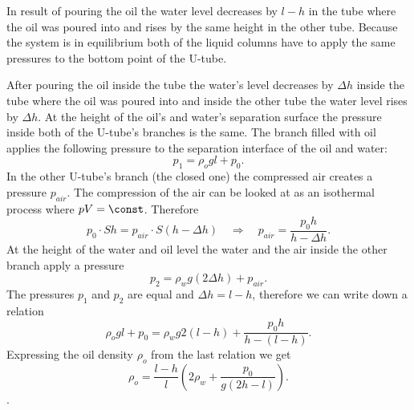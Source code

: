 \hinteng
In result of pouring the oil the water level decreases by $l - h$ in the tube where the oil was poured into and rises by the same height in the other tube. Because the system is in equilibrium both of the liquid columns have to apply the same pressures to the bottom point of the U-tube.

\solueng
After pouring the oil inside the tube the water’s level decreases by $\Delta h$ inside the tube where the oil was poured into and inside the other tube the water level rises by $\Delta h$. At the height of the oil’s and water’s separation surface the pressure inside both of the U-tube’s branches is the same. The branch filled with oil applies the following pressure to the separation interface of the oil and water:
\[ p_1 = \rho_{o}gl + p_0.\]
In the other U-tube’s branch (the closed one) the compressed air creates a pressure $p_{air}$. The compression of the air can be looked at as an isothermal process where $pV = \const$. Therefore
\[ p_0\cdot Sh = p_{air}\cdot S(h-\Delta h) \quad\Rightarrow\quad p_{air} = \frac{p_0h}{h-\Delta h}.\]
At the height of the water and oil level the water and the air inside the other branch apply a pressure
\[ p_2 = \rho_wg(2\Delta h) + p_{air}.\]
The pressures $p_1$ and $p_2$ are equal and $\Delta h = l - h$, therefore we can write down a relation
\[ \rho_{o}gl + p_0 = \rho_wg2(l-h) + \frac{p_0h}{h-(l-h)}.\]
Expressing the oil density $\rho_{o}$ from the last relation we get
\[ \rho_{o} = \frac{l-h}{l}\left(2\rho_w+\frac{p_0}{g(2h-l)}\right).\].
\probend